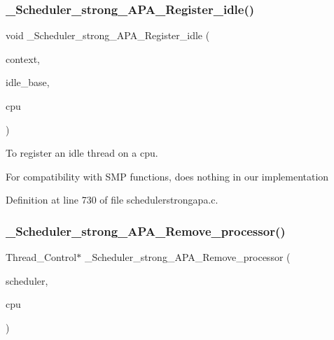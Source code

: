\subsubsection{\texorpdfstring{\+\_\+\+Scheduler\+\_\+strong\+\_\+\+A\+P\+A\+\_\+\+Register\+\_\+idle()}{\_Scheduler\_strong\_APA\_Register\_idle()}}
{\footnotesize\ttfamily void \+\_\+\+Scheduler\+\_\+strong\+\_\+\+A\+P\+A\+\_\+\+Register\+\_\+idle (\begin{DoxyParamCaption}\item[{Scheduler\+\_\+\+Context $\ast$}]{context,  }\item[{Scheduler\+\_\+\+Node $\ast$}]{idle\+\_\+base,  }\item[{Per\+\_\+\+C\+P\+U\+\_\+\+Control $\ast$}]{cpu }\end{DoxyParamCaption})}



To register an idle thread on a cpu. 

For compatibility with S\+MP functions, does nothing in our implementation 

Definition at line 730 of file schedulerstrongapa.\+c.

\mbox{\label{group__RTEMSScoreSchedulerStrongAPA_ga91dc29dcdeea35e3329623be7a798e39}} 
\subsubsection{\texorpdfstring{\+\_\+\+Scheduler\+\_\+strong\+\_\+\+A\+P\+A\+\_\+\+Remove\+\_\+processor()}{\_Scheduler\_strong\_APA\_Remove\_processor()}}
{\footnotesize\ttfamily Thread\+\_\+\+Control$\ast$ \+\_\+\+Scheduler\+\_\+strong\+\_\+\+A\+P\+A\+\_\+\+Remove\+\_\+processor (\begin{DoxyParamCaption}\item[{const Scheduler\+\_\+\+Control $\ast$}]{scheduler,  }\item[{Per\+\_\+\+C\+P\+U\+\_\+\+Control $\ast$}]{cpu }\end{DoxyParamCaption})}




